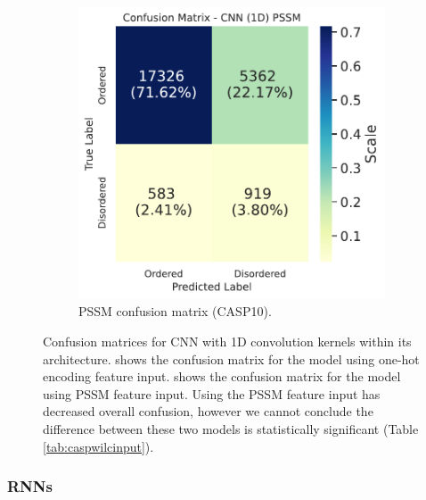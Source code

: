 \documentclass{l4proj}
\begin{document}
\begin{figure}[!htb]
\begin{subfigure}[b]{0.48\textwidth}
        \includegraphics[width=\textwidth]{images/confmats/CASP10CNN1Dpssm-cf.pdf}
        \caption{PSSM confusion matrix (CASP10).}
        \label{fig:caspcf1dpssm}
    \end{subfigure}
    \caption{Confusion matrices for CNN with 1D convolution kernels within its architecture.  shows the confusion matrix for the model using one-hot encoding feature input.  shows the confusion matrix for the model using PSSM feature input. Using the PSSM feature input has decreased overall confusion, however we cannot conclude the difference between these two models is statistically significant (Table \ref{tab:caspwilcinput}).}
    \label{fig:caspcf1d}
\end{figure}

\subsubsection{RNNs \newline}
\end{document}

